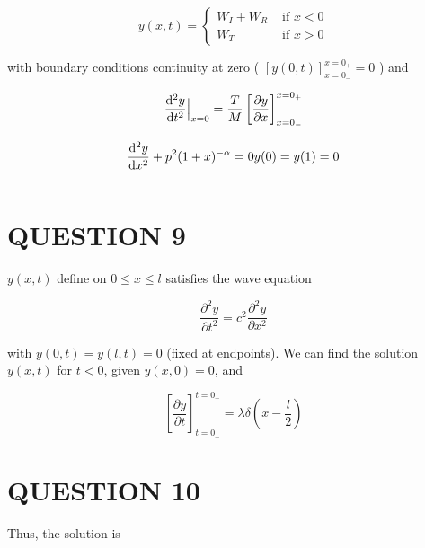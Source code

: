\documentclass[a4paper]{article}
\begin{document}
\begin{enumerate}
	\[ y(x,t) = \begin{cases} W_{I} + W_{R}  & \text{ if } x < 0 \\ W_{T} & \text{ if } x > 0 \end{cases} \]
	
	with boundary conditions continuity at zero ( $ [ y(0,t) ]_{x = 0_{-}}^{x = 0_{+}} = 0 $ ) and 
	
	\[  \frac{\mathrm{d}^{2} y }{\mathrm{d} t^{2}} \Big|_{x=0} = \frac{T}{M} \left[  \frac{\partial y }{\partial x} \right]_{x = 0_{-}}^{x = 0_{+}} \]
	
	
	\end{enumerate}


\[ \frac{\d^{2} y }{\d x^{2} } + p^{2}(1+x)^{-\alpha} = 0 

y(0) = y(1) = 0 \]


\[  \]





\section{QUESTION 9}


$ y(x,t) $ define on $ 0 \leq x \leq l $ satisfies the wave equation

\[ \frac{\partial^{2}  y}{\partial t^{2} } = c^{2} \frac{\partial^{2} y }{\partial x^{2}} \]

with $ y(0,t) = y(l,t) = 0 $ (fixed at endpoints). We can find the solution $ y(x,t) $ for $ t < 0 $, given $ y(x,0) = 0 $, and 

\[ \left[  \frac{\partial y }{\partial t} \right]_{t = 0_{-}}^{t = 0_{+}} = \lambda \delta \left( x - \frac{l}{2} \right) \] 



\section{QUESTION 10}


Thus, the solution is 
\end{document}
